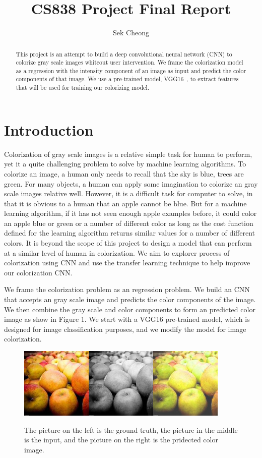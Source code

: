 \documentclass[12pt]{article}
\begin{document}
\title{CS838 Project Final Report}
\author{Sek Cheong}
\maketitle

\begin{abstract}
This project is an attempt to build a deep convolutional neural network (CNN) to colorize gray scale images whiteout user intervention. We frame the colorization model as a regression with the intensity component of an image as input and predict the color components of that image.  We use a pre-trained model, VGG16~\cite{VGG16}, to extract features that will be used for training our colorizing model.
\end{abstract}

\section{Introduction}
Colorization of gray scale images is a relative simple task for human to perform, yet it a quite challenging problem to solve by machine learning algorithms. To colorize an image, a human only needs to recall that the sky is blue, trees are green. For many objects, a human can apply some imagination to colorize an gray scale images relative well. However, it is a difficult task for computer to solve, in that it is obvious to a human that an apple cannot be blue. But for a machine learning algorithm, if it has not seen enough apple examples before, it could color an apple blue or green or a number of different color as long as the cost function defined for the learning algorithm returns similar values for a number of different colors. It is beyond the scope of this project to design a model that can perform at a similar level of human in colorization. We aim to explorer process of colorization using CNN and use the transfer learning technique to help improve our colorization CNN. 

We frame the colorization problem as an regression problem. We build an CNN that accepts an gray scale image and predicts the color components of the image. We then combine the gray scale and color components to form an predicted color image as show in Figure 1. We start with a VGG16 pre-trained model, which is designed for image classification purposes, and we modify the model for image colorization.   

\begin{figure}[!ht]
 \centering
  \includegraphics[width=4.0in]{resource/example.jpg}
 \label{sampleimages}
 \caption{The picture on the left is the ground truth, the picture in the middle is the input, and the picture on the right is the pridected color image.}
\end{figure}
\end{document}
